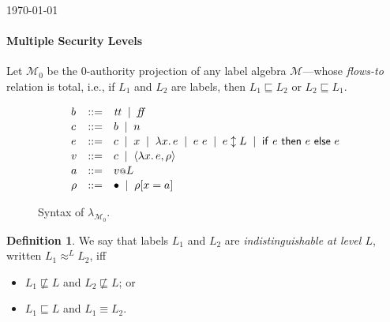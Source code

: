 \documentclass{article}
\makeatletter
\theoremstyle{definition}
\newtheorem{definition}{Definition}
\newcommand{\at}{\ensuremath{{\scriptstyle{@}}}}
\makeatother
\begin{document}
\begin{flushright}
  \today
\end{flushright}

\paragraph{Multiple Security Levels}
Let $\mathcal{M}_{0}$ be the 0-authority projection of any label algebra
$\mathcal{M}$---whose \emph{flows-to} relation is total, i.e., if $L_1$ and
$L_2$ are labels, then $L_1 \sqsubseteq L_2$ or $L_2 \sqsubseteq L_1$.

\begin{figure}[ht]
  \centering
  \[
  \begin{array}[t]{lcl}
    b & ::= &
    \mathit{tt}\;\; |\;\;
    \mathit{ff}
    \\[0.3ex]
    c & :: = &
    b\;\; |\;\;
    n
    \\[0.3ex]
    e & ::= &
    c\;\; |\;\;
    x\;\; |\;\;
    \lambda{x}.\, e\;\; |\;\;
    e\ e\;\; |\;\;
    e \updownarrow L\;\; |\;\;
    \mathsf{if}\ e\ \mathsf{then}\ e\ \mathsf{else}\ e
    \\[0.3ex]
    v & ::= &
    c\;\; |\;\;
    \langle{\lambda{x}.\, e, \rho\rangle}
    \\[0.3ex]
    a & ::= &
    v \at L
    \\[0.3ex]
    \rho & ::= &
    \bullet\;\; |\;\;
    \rho[x = a]
  \end{array}
  \]
  \caption{Syntax of $\lambda_{\mathcal{M}_{0}}$.}
  \label{fig:syntax}
\end{figure}

\begin{definition}
  We say that labels $L_1$ and $L_2$ are \emph{indistinguishable at
    level $L$}, written $L_1 \approx^{L} L_2$, iff
  \begin{itemize}
  \item
    $L_1 \not\sqsubseteq L$ and
    $L_2 \not\sqsubseteq L$; or
  \item
    $L_1 \sqsubseteq L$ and
    $L_1 \equiv L_2$.
  \end{itemize}
  \label{def:lab-equiv}
\end{definition}
\end{document}
